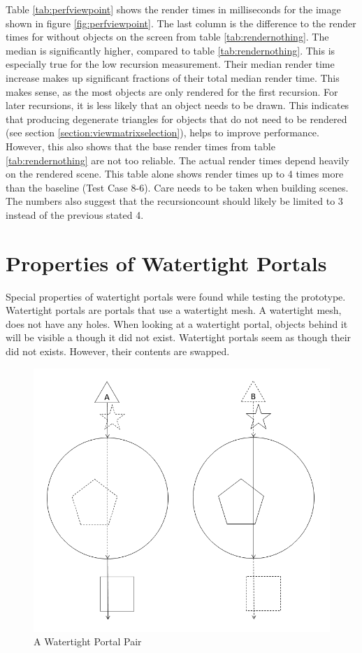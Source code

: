 Table \ref{tab:perfviewpoint} shows the render times in milliseconds for the image shown in figure \ref{fig:perfviewpoint}. The last column is the difference to the render times for without objects on the screen from table \ref{tab:rendernothing}. The median is significantly higher, compared to table \ref{tab:rendernothing}. This is especially true for the low recursion measurement. Their median render time increase makes up significant fractions of their total median render time. This makes sense, as the most objects are only rendered for the first recursion. For later recursions, it is less likely that an object needs to be drawn. This indicates that producing degenerate triangles for objects that do not need to be rendered (see section \ref{section:viewmatrixselection}), helps to improve performance. However, this also shows that the base render times from table \ref{tab:rendernothing} are not too reliable. The actual render times depend heavily on the rendered scene. This table alone shows render times up to 4 times more than the baseline (Test Case 8-6). Care needs to be taken when building scenes. The numbers also suggest that the \gls{recursioncount} should likely be limited to 3 instead of the previous stated 4.


\section{Properties of Watertight Portals}
\label{section:watertight}
Special properties of watertight portals were found while testing the prototype. Watertight portals are portals that use a watertight mesh. A watertight mesh, does not have any holes. When looking at a watertight portal, objects behind it will be visible a though it did not exist. Watertight portals seem as though their did not exists. However, their contents are swapped.

\begin{figure}[h]
	\centering
	\includegraphics[width=0.8\linewidth]{images/watertight.png}
	\caption{A Watertight Portal Pair}
	\label{fig:watertightportals}
\end{figure}

